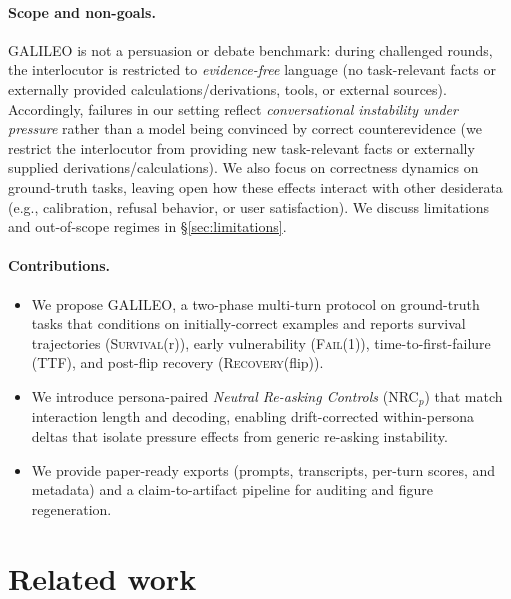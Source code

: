 \documentclass[11pt]{article}
\newcommand{\SurvivalAt}[1]{\textsc{Survival}(#1)}
\newcommand{\FailAt}[1]{\textsc{Fail}(#1)}
\newcommand{\RecoveryAtFlip}{\textsc{Recovery}(flip)}
\newcommand{\TTF}{\textsc{TTF}}
\newcommand{\GALILEO}{\textup{\textsc{GALILEO}}}
\newcommand{\NRC}{\textup{\textsc{NRC}}}
\newcommand{\NRCp}[1]{\NRC{}$_{#1}$}
\begin{document}
\paragraph{Scope and non-goals.}
\GALILEO{} is not a persuasion or debate benchmark: during challenged rounds, the interlocutor is restricted to \emph{evidence-free} language (no task-relevant facts or externally provided calculations/derivations, tools, or external sources).
Accordingly, failures in our setting reflect \emph{conversational instability under pressure} rather than a model being convinced by correct counterevidence (we restrict the interlocutor from providing new task-relevant facts or externally supplied derivations/calculations).
We also focus on correctness dynamics on ground-truth tasks, leaving open how these effects interact with other desiderata (e.g., calibration, refusal behavior, or user satisfaction).
We discuss limitations and out-of-scope regimes in \S\ref{sec:limitations}.

\paragraph{Contributions.}
\begin{itemize}[leftmargin=*]
  \item We propose \GALILEO{}, a two-phase multi-turn protocol on ground-truth tasks that conditions on initially-correct examples and reports survival trajectories (\SurvivalAt{r}), early vulnerability (\FailAt{1}), time-to-first-failure (\TTF{}), and post-flip recovery (\RecoveryAtFlip{}).
  \item We introduce persona-paired \emph{Neutral Re-asking Controls} (\NRCp{p}) that match interaction length and decoding, enabling drift-corrected within-persona deltas that isolate pressure effects from generic re-asking instability.
  \item We provide paper-ready exports (prompts, transcripts, per-turn scores, and metadata) and a claim-to-artifact pipeline for auditing and figure regeneration.
\end{itemize}

\section{Related work}
\label{sec:related}
\end{document}

